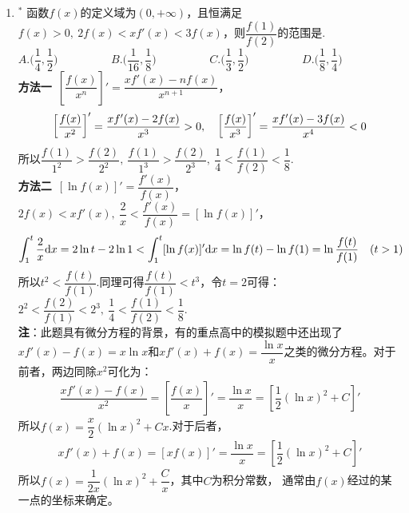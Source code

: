 \begin{enumerate}[label={【\textbf{例\thechapter.\arabic*}】},
 leftmargin=\inteval{\myenumleftmargin}pt,
 itemsep=\inteval{\myenumitempsep}pt,
 itemindent=\inteval{\myenumitemindent}pt]
\item $ ^* $ 函数$ f(x) $的定义域为$ (0,+\infty) $，且恒满足$ f(x)>0,\ 2f(x)<xf'(x)<3f(x) $，则$ \dfrac{f(1)}{f(2)} $的范围是\underline{\hspace{2cm}}.\\
$ A. \Big(\dfrac{1}{4},\dfrac{1}{2}\Big) \hspace{2cm} 
  B. \Big(\dfrac{1}{16},\dfrac{1}{8}\Big) \hspace{2cm} 
  C. \Big(\dfrac{1}{3},\dfrac{1}{2}\Big)\hspace{2cm} 
  D. \Big(\dfrac{1}{8},\dfrac{1}{4}\Big)  $ \medskip \\
\textbf{方法一}\ $ \left[\dfrac{f(x)}{x^n}\right]'=
\dfrac{xf'(x)-nf(x)}{x^{n+1}} $，
\begin{gather*}
  \left[\dfrac{f(x)}{x^2}\right]'=\dfrac{xf'(x)-2f(x)}{x^{3}}>0,\quad \left[\dfrac{f(x)}{x^3}\right]'=\dfrac{xf'(x)-3f(x)}{x^{4}}<0
\end{gather*}
所以$ \dfrac{f(1)}{1^2}>\dfrac{f(2)}{2^2},\ 
\dfrac{f(1)}{1^3}>\dfrac{f(2)}{2^3},\
\dfrac{1}{4}<\dfrac{f(1)}{f(2)}<\dfrac{1}{8} $.\\
\textbf{方法二}\ $ [\ln f(x)]'
=\dfrac{f'(x)}{f(x)} $，$ 2f(x)<xf'(x),\ \dfrac{2}{x}
<\dfrac{f'(x)}{f(x)}=[\ln f(x)]' $，
\begin{gather*}
	\int_1^t \dfrac{2}{x}\mathrm{d} x= 2\ln t-2\ln 1<
	\int_1^t [\ln f(x)]'\mathrm{d} x=\ln f(t)-\ln f(1)=
	\ln\dfrac{f(t)}{f(1)} \quad (t>1)
\end{gather*}
所以$ t^2<\dfrac{f(t)}{f(1)} $.同理可得$ \dfrac{f(t)}
{f(1)}<t^3 $，令$ t=2 $可得：$ 2^2<\dfrac{f(2)}{f(1)}<2^3 ,\ \dfrac{1}{4}<\dfrac{f(1)}{f(2)}<\dfrac{1}{8} $.\\
\textbf{注}：此题具有微分方程的背景，有的重点高中的模拟题中还出现了$ xf'(x)-f(x)=x\ln x $和$ xf'(x)+f(x)=\dfrac{\ln x}{x} $之类的微分方程。对于前者，两边同除$ x^2 $可化为：
\begin{gather*}
    \dfrac{xf'(x)-f(x)}{x^2}=\left[\dfrac{f(x)}{x}\right]'= \dfrac{\ln x}{x}=\left[\dfrac{1}{2}(\ln x)^2+C\right]'
\end{gather*}
所以$ f(x)=\dfrac{x}{2}(\ln x)^2+Cx $.对于后者，
\begin{gather*}
    xf'(x)+f(x)=[xf(x)]'=\dfrac{\ln x}{x}=
    \left[\dfrac{1}{2}(\ln x)^2+C\right]'
\end{gather*}
所以$ f(x)=\dfrac{1}{2x}(\ln x)^2+\dfrac{C}{x} $，其中$ C $为积分常数，
通常由$ f(x) $经过的某一点的坐标来确定。


\end{enumerate}
